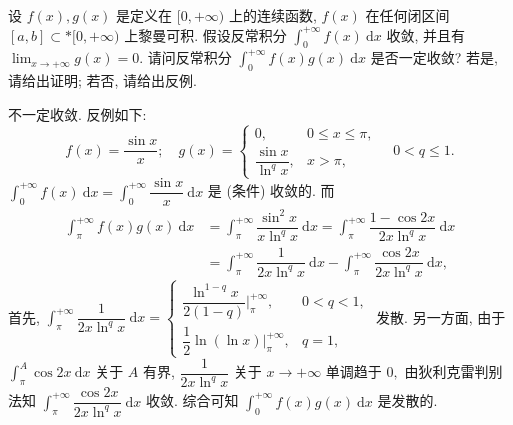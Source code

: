 \begin{question}[points = 10]
设 $f(x), g(x)$ 是定义在 $[0, +\infty)$ 上的连续函数, $f(x)$ 在任何闭区间 $[a, b] \subset* [0, +\infty)$ 上黎曼可积. 假设反常积分 $\displaystyle \int_0^{+\infty} f(x) ~ \mathrm{d} x$ 收敛, 并且有 $\displaystyle \lim_{x\to+\infty} g(x) = 0.$ 请问反常积分 $\displaystyle \int_0^{+\infty} f(x)g(x) ~ \mathrm{d} x$ 是否一定收敛? 若是, 请给出证明; 若否, 请给出反例.

\end{question}

\begin{solution}
不一定收敛. 反例如下:
\begin{equation*}
f(x) = \dfrac{\sin x}{x}; \quad g(x) = \begin{cases}
0, & 0 \leqslant x \leqslant \pi, \\
\dfrac{\sin x}{\ln^q x}, & x > \pi,
\end{cases} \quad 0 < q \leqslant 1.
\end{equation*}
$\displaystyle \int_0^{+\infty} f(x) ~ \mathrm{d} x = \int_0^{+\infty} \dfrac{\sin x}{x} ~ \mathrm{d} x$ 是 (条件) 收敛的. 而
\begin{align*}
\int_\pi^{+\infty} f(x)g(x) ~ \mathrm{d} x & = \int_\pi^{+\infty} \dfrac{\sin^2 x}{x \ln^q x} ~ \mathrm{d} x = \int_\pi^{+\infty} \dfrac{1 - \cos 2x}{2x \ln^q x} ~ \mathrm{d} x \\
& = \int_\pi^{+\infty} \dfrac{1}{2x \ln^q x} ~ \mathrm{d} x - \int_\pi^{+\infty} \dfrac{\cos 2x}{2x \ln^q x} ~ \mathrm{d} x,
\end{align*}
首先, $\displaystyle \int_\pi^{+\infty} \dfrac{1}{2x \ln^q x} ~ \mathrm{d} x = \begin{cases}
\dfrac{\ln^{1-q} x}{2(1 -q)} \bigg|_\pi^{+\infty}, & 0 < q < 1, \\
\dfrac{1}{2} \ln (\ln x) \bigg|_\pi^{+\infty}, & q = 1,
\end{cases}$ 发散. 另一方面, 由于 $\displaystyle \int_\pi^{A} \cos 2x ~ \mathrm{d} x$ 关于 $A$ 有界, $\dfrac{1}{2x \ln^q x}$ 关于 $x \to +\infty$ 单调趋于 $0,$ 由狄利克雷判别法知 $\displaystyle \int_\pi^{+\infty} \dfrac{\cos 2x}{2x \ln^q x} ~ \mathrm{d} x$ 收敛. 综合可知 $\displaystyle \int_0^{+\infty} f(x)g(x) ~ \mathrm{d} x$ 是发散的.
\end{solution}


